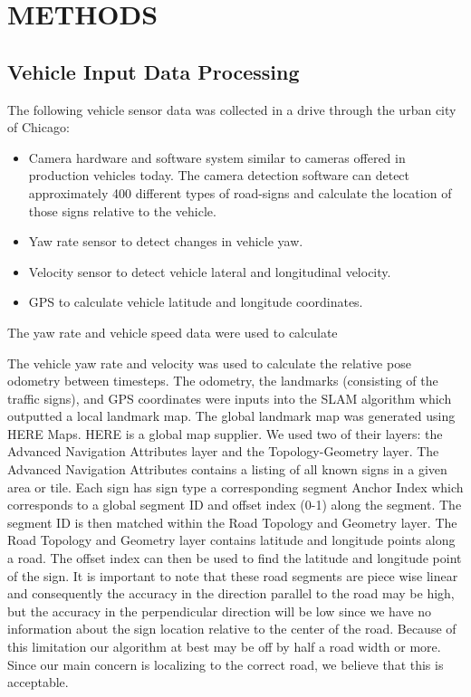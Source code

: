 \documentclass[letterpaper, 10 pt, conference]{ieeeconf}  %
\begin{document}
\section{METHODS}

\subsection{Vehicle Input Data Processing}

The following vehicle sensor data was collected in a drive through the urban city of Chicago:
\begin{itemize}
\item Camera hardware and software system similar to cameras offered in production vehicles today. The camera detection software can detect approximately 400 different types of road-signs and calculate the location of those signs relative to the vehicle. 
\item Yaw rate sensor to detect changes in vehicle yaw.
\item Velocity sensor to detect vehicle lateral and longitudinal velocity.
\item GPS to calculate vehicle latitude and longitude coordinates.
\end{itemize}

The yaw rate and vehicle speed data were used to calculate 

The vehicle yaw rate and velocity was used to calculate the relative pose odometry between timesteps. The odometry, the landmarks (consisting of the traffic signs), and GPS coordinates were inputs into the SLAM algorithm which outputted a local landmark map. 
The global landmark map was generated using HERE Maps. HERE is a global map supplier. We used two of their layers: the Advanced Navigation Attributes layer and the Topology-Geometry layer. The Advanced Navigation Attributes contains a listing of all known signs in a given area or tile. Each sign has sign type a corresponding segment Anchor Index which corresponds to a global segment ID and offset index (0-1) along the segment. The segment ID is then matched within the Road Topology and Geometry layer. The Road Topology and Geometry layer contains latitude and longitude points along a road. The offset index can then be used to find the latitude and longitude point of the sign.
It is important to note that these road segments are piece wise linear and consequently the accuracy in the direction parallel to the road may be high, but the accuracy in the perpendicular direction will be low since we have no information about the sign location relative to the center of the road. Because of this limitation our algorithm at best may be off by half a road width or more. Since our main concern is localizing to the correct road, we believe that this is acceptable. 
\end{document}
